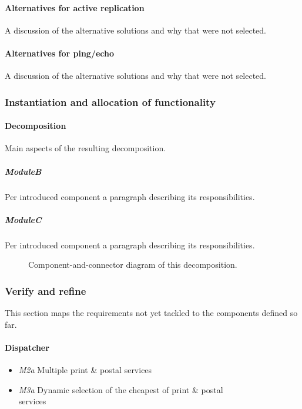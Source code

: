\documentclass[a4paper,10pt]{article}
\begin{document}
\paragraph{Alternatives for active replication}
A discussion of the alternative solutions and why that were not selected.

\paragraph{Alternatives for ping/echo}
A discussion of the alternative solutions and why that were not selected.

\subsubsection{Instantiation and allocation of functionality}
\paragraph{Decomposition}
Main aspects of the resulting decomposition.

\subparagraph{ModuleB}
Per introduced component a paragraph describing its responsibilities.

\subparagraph{ModuleC}
Per introduced component a paragraph describing its responsibilities.

\begin{figure}[!htp]
	\centering
	\caption{Component-and-connector diagram of this decomposition.
	}\label{fig:it1-cc_main}
\end{figure}
\subsubsection{Verify and refine}
This section maps the requirements not yet tackled to the components defined so far.
\paragraph{Dispatcher}
\begin{itemize}
	\item \emph{M2a} Multiple print \& postal services \\ 
	\item \emph{M3a} Dynamic selection of the cheapest of print \& postal\\ services
\end{itemize}
\end{document}
